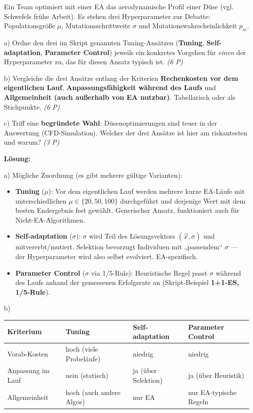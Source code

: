 \documentclass[11pt, a4paper]{article}
\begin{document}
Ein Team optimiert mit einer EA das aerodynamische Profil einer Düse (vgl. Schwefels frühe Arbeit). Es stehen drei Hyperparameter zur Debatte: Populationsgröße $\mu$, Mutationsschrittweite $\sigma$ und Mutationswahrscheinlichkeit $p_m$.


a) Ordne den drei im Skript genannten Tuning-Ansätzen (\textbf{Tuning}, \textbf{Self-adaptation}, \textbf{Parameter Control}) jeweils ein konkretes Vorgehen für \textit{einen} der Hyperparameter zu, das für diesen Ansatz typisch ist. \textit{(6 P)}


b) Vergleiche die drei Ansätze entlang der Kriterien \textbf{Rechenkosten vor dem eigentlichen Lauf}, \textbf{Anpassungsfähigkeit während des Laufs} und \textbf{Allgemeinheit (auch außerhalb von EA nutzbar)}. Tabellarisch oder als Stichpunkte. \textit{(6 P)}


c) Triff eine \textbf{begründete Wahl}: Düsenoptimierungen sind teuer in der Auswertung (CFD-Simulation). Welcher der drei Ansätze ist hier am riskantesten und warum? \textit{(3 P)}


\textbf{Lösung:}


a) Mögliche Zuordnung (es gibt mehrere gültige Varianten):

\begin{itemize}
  \item \textbf{Tuning} ($\mu$): Vor dem eigentlichen Lauf werden mehrere kurze EA-Läufe mit unterschiedlichen $\mu \in \{20, 50, 100\}$ durchgeführt und derjenige Wert mit dem besten Endergebnis fest gewählt. Generischer Ansatz, funktioniert auch für Nicht-EA-Algorithmen.
  \item \textbf{Self-adaptation} ($\sigma$): $\sigma$ wird Teil des Lösungsvektors $(\vec x, \sigma)$ und mitvererbt/mutiert. Selektion bevorzugt Individuen mit „passendem“ $\sigma$ — der Hyperparameter wird also selbst evolviert. EA-spezifisch.
  \item \textbf{Parameter Control} ($\sigma$ via 1/5-Rule): Heuristische Regel passt $\sigma$ während des Laufs anhand der gemessenen Erfolgsrate an (Skript-Beispiel \textbf{1+1-ES, 1/5-Rule}).
\end{itemize}

b)



{\small
\begin{tabularx}{\linewidth}{XXXX}
\hline
\rowcolor{tableheadbg}
{\color{white}\textbf{Kriterium}} & {\color{white}\textbf{Tuning}} & {\color{white}\textbf{Self-adaptation}} & {\color{white}\textbf{Parameter Control}} \\[2pt]
\hline
\endhead
\hline
\endfoot
Vorab-Kosten & hoch (viele Probeläufe) & niedrig & niedrig \\
Anpassung im Lauf & nein (statisch) & ja (über Selektion) & ja (über Heuristik) \\
Allgemeinheit & hoch (auch andere Algos) & nur EA & nur EA-typische Regeln \\
\end{tabularx}
}
\end{document}
